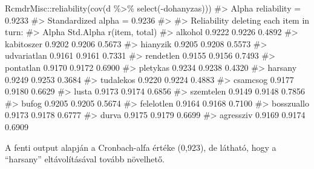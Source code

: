 \documentclass[
  letterpaper,
]{krantz}
\makeatletter
\newenvironment{Shaded}{\begin{snugshade}}{\end{snugshade}}
\newcommand{\CommentTok}[1]{\textcolor[rgb]{0.37,0.37,0.37}{#1}}
\newcommand{\FunctionTok}[1]{\textcolor[rgb]{0.28,0.35,0.67}{#1}}
\newcommand{\NormalTok}[1]{\textcolor[rgb]{0.00,0.23,0.31}{#1}}
\newcommand{\SpecialCharTok}[1]{\textcolor[rgb]{0.37,0.37,0.37}{#1}}
\newenvironment{kframe}{%
\medskip{}
\setlength{\fboxsep}{.8em}
 \def\at@end@of@kframe{}%
 \ifinner\ifhmode%
  \def\at@end@of@kframe{\end{minipage}}%
  \begin{minipage}{\columnwidth}%
 \fi\fi%
 \def\FrameCommand##1{\hskip\@totalleftmargin \hskip-\fboxsep
 \colorbox{shadecolor}{##1}\hskip-\fboxsep
     \hskip-\linewidth \hskip-\@totalleftmargin \hskip\columnwidth}%
 \MakeFramed {\advance\hsize-\width
   \@totalleftmargin\z@ \linewidth\hsize
   \@setminipage}}%
 {\par\unskip\endMakeFramed%
 \at@end@of@kframe}
\renewenvironment{Shaded}{\begin{kframe}}{\end{kframe}}
\makeatother
\begin{document}
\begin{Shaded}
\begin{Highlighting}[]
\NormalTok{RcmdrMisc}\SpecialCharTok{::}\FunctionTok{reliability}\NormalTok{(}\FunctionTok{cov}\NormalTok{(d }\SpecialCharTok{\%\textgreater{}\%}
    \FunctionTok{select}\NormalTok{(}\SpecialCharTok{{-}}\NormalTok{dohanyzas)))}
\CommentTok{\#\textgreater{} Alpha reliability =  0.9233 }
\CommentTok{\#\textgreater{} Standardized alpha =  0.9236 }
\CommentTok{\#\textgreater{} }
\CommentTok{\#\textgreater{} Reliability deleting each item in turn:}
\CommentTok{\#\textgreater{}              Alpha Std.Alpha r(item, total)}
\CommentTok{\#\textgreater{} alkohol     0.9222    0.9226         0.4892}
\CommentTok{\#\textgreater{} kabitoszer  0.9202    0.9206         0.5673}
\CommentTok{\#\textgreater{} hianyzik    0.9205    0.9208         0.5573}
\CommentTok{\#\textgreater{} udvariatlan 0.9161    0.9161         0.7331}
\CommentTok{\#\textgreater{} rendetlen   0.9155    0.9156         0.7493}
\CommentTok{\#\textgreater{} pontatlan   0.9170    0.9172         0.6900}
\CommentTok{\#\textgreater{} pletykas    0.9234    0.9238         0.4320}
\CommentTok{\#\textgreater{} harsany     0.9249    0.9253         0.3684}
\CommentTok{\#\textgreater{} tudalekos   0.9220    0.9224         0.4883}
\CommentTok{\#\textgreater{} csamcsog    0.9177    0.9180         0.6629}
\CommentTok{\#\textgreater{} lusta       0.9173    0.9174         0.6856}
\CommentTok{\#\textgreater{} szemtelen   0.9149    0.9148         0.7856}
\CommentTok{\#\textgreater{} bufog       0.9205    0.9205         0.5674}
\CommentTok{\#\textgreater{} felelotlen  0.9164    0.9168         0.7100}
\CommentTok{\#\textgreater{} bosszuallo  0.9173    0.9178         0.6777}
\CommentTok{\#\textgreater{} durva       0.9175    0.9179         0.6699}
\CommentTok{\#\textgreater{} agressziv   0.9169    0.9174         0.6909}
\end{Highlighting}
\end{Shaded}

A fenti output alapján a Cronbach-alfa értéke (0,923), de látható, hogy
a ``harsany'' eltávolításával tovább növelhető.
\end{document}
